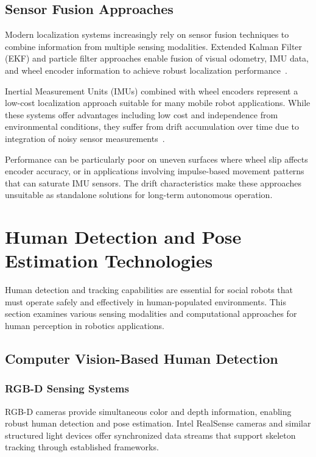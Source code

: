 \subsection{Sensor Fusion Approaches}
Modern localization systems increasingly rely on sensor fusion techniques to combine information from multiple sensing modalities. Extended Kalman Filter (EKF) and particle filter approaches enable fusion of visual odometry, IMU data, and wheel encoder information to achieve robust localization performance~\cite{huang2018sensor}.

Inertial Measurement Units (IMUs) combined with wheel encoders represent a low-cost localization approach suitable for many mobile robot applications. While these systems offer advantages including low cost and independence from environmental conditions, they suffer from drift accumulation over time due to integration of noisy sensor measurements~\cite{borenstein1996measurement}.

Performance can be particularly poor on uneven surfaces where wheel slip affects encoder accuracy, or in applications involving impulse-based movement patterns that can saturate IMU sensors. The drift characteristics make these approaches unsuitable as standalone solutions for long-term autonomous operation.

\section{Human Detection and Pose Estimation Technologies}
Human detection and tracking capabilities are essential for social robots that must operate safely and effectively in human-populated environments. This section examines various sensing modalities and computational approaches for human perception in robotics applications.

\subsection{Computer Vision-Based Human Detection}
\subsubsection{RGB-D Sensing Systems}
RGB-D cameras provide simultaneous color and depth information, enabling robust human detection and pose estimation. Intel RealSense cameras and similar structured light devices offer synchronized data streams that support skeleton tracking through established frameworks.

